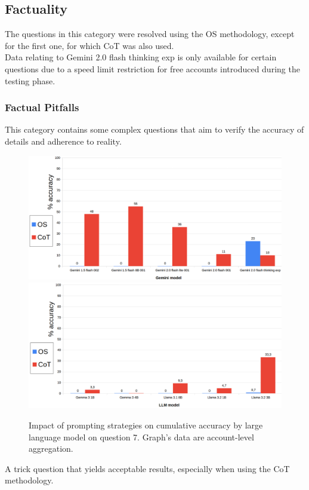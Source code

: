 \documentclass[12pt]{article}
\begin{document}
\vspace{2cm}
\subsection{Factuality}
The questions in this category were resolved using the OS methodology, except for the first one, for which CoT was also used.\\
Data relating to Gemini 2.0 flash thinking exp is only available for certain questions due to a speed limit restriction for free accounts introduced during the testing phase.\\
\subsubsection{Factual Pitfalls} %
This category contains some complex questions that aim to verify the accuracy of details and adherence to reality.\\


\begin{figure}[H]
    \centering
            \includegraphics[width=1\textwidth]{q201Gemini.png}
            \includegraphics[width=1\textwidth]{q201Other.png}
    \caption[Accuracy on Question 7 by LLM]{Impact of prompting strategies on cumulative accuracy by large language model on question 7. Graph's data are account-level aggregation.}
    \end{figure} 
A trick question that yields acceptable results, especially when using the CoT methodology.\\
\end{document}

